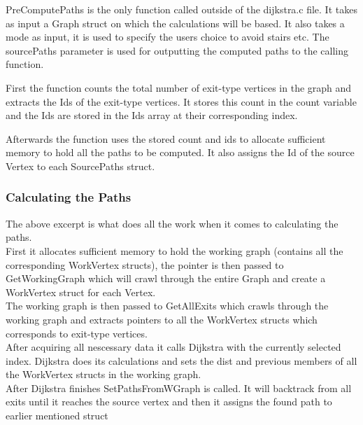PreComputePaths is the only function called outside of the dijkstra.c file. It takes as input a Graph struct on which the calculations will be based. It also takes a mode as input, it is used to specify the users choice to avoid stairs etc. The sourcePaths parameter is used for outputting the computed paths to the calling function.



First the function counts the total number of exit-type vertices in the graph and extracts the Ids of the exit-type vertices. It stores this count in the count variable and the Ids are stored in the Ids array at their corresponding index.



Afterwards the function uses the stored count and ids to allocate sufficient memory to hold all the paths to be computed. It also assigns the Id of the source Vertex to each SourcePaths struct.

\subsubsection{Calculating the Paths}



The above excerpt is what does all the work when it comes to calculating the paths.\\
First it allocates sufficient memory to hold the working graph (contains all the corresponding WorkVertex structs), the pointer is then passed to GetWorkingGraph which will crawl through the entire Graph and create a WorkVertex struct for each Vertex.\\
The working graph is then passed to GetAllExits which crawls through the working graph and extracts pointers to all the WorkVertex structs which corresponds to exit-type vertices.\\
After acquiring all nescessary data it calls Dijkstra with the currently selected index. Dijkstra does its calculations and sets the dist and previous members of all the WorkVertex structs in the working graph.\\
After Dijkstra finishes SetPathsFromWGraph is called. It will backtrack from all exits until it reaches the source vertex and then it assigns the found path to earlier mentioned struct 